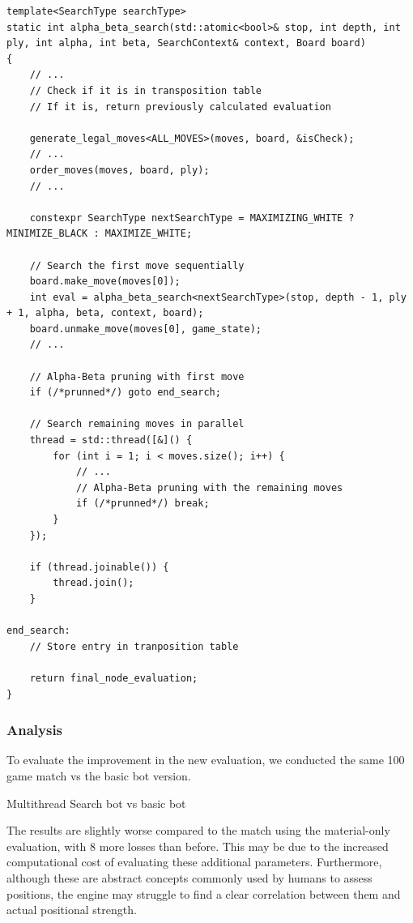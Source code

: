 \begin{lstlisting}[breaklines=true]
template<SearchType searchType>
static int alpha_beta_search(std::atomic<bool>& stop, int depth, int ply, int alpha, int beta, SearchContext& context, Board board)
{
    // ...
    // Check if it is in transposition table
    // If it is, return previously calculated evaluation

    generate_legal_moves<ALL_MOVES>(moves, board, &isCheck);
    // ...
    order_moves(moves, board, ply);
    // ...
    
    constexpr SearchType nextSearchType = MAXIMIZING_WHITE ? MINIMIZE_BLACK : MAXIMIZE_WHITE;

    // Search the first move sequentially
    board.make_move(moves[0]);
    int eval = alpha_beta_search<nextSearchType>(stop, depth - 1, ply + 1, alpha, beta, context, board);
    board.unmake_move(moves[0], game_state);
    // ...

    // Alpha-Beta pruning with first move
    if (/*prunned*/) goto end_search;

    // Search remaining moves in parallel
    thread = std::thread([&]() {
        for (int i = 1; i < moves.size(); i++) {
            // ...
            // Alpha-Beta pruning with the remaining moves
            if (/*prunned*/) break;
        }
    });
    
    if (thread.joinable()) {
        thread.join();
    }

end_search:
    // Store entry in tranposition table

    return final_node_evaluation;
}
\end{lstlisting}

\subsubsection{Analysis}

To evaluate the improvement in the new evaluation, we conducted the same 100 game match vs the basic bot version. 

\begin{center}
Multithread Search bot vs basic bot\\
\medskip
\end{center}

\noindent The results are slightly worse compared to the match using the material-only evaluation, with 8 more losses than before. This may be due to the increased computational cost of evaluating these additional parameters. Furthermore, although these are abstract concepts commonly used by humans to assess positions, the engine may struggle to find a clear correlation between them and actual positional strength.

